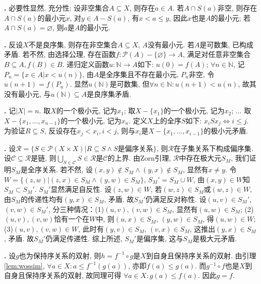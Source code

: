 \par \textbf{\thesolpar .} 必要性显然. 充分性: 设非空集合$A\subseteq X$, 则存在$a\in A$. 若$A\cap S(a)$非空, 则存在$A\cap S(a)$的最小元$x$, 对$y\in A-S(a)$, 有$x<a\le y$, 因此$x$也是$A$的最小元; 若$A\cap S(a)= \varnothing$, 则$a$是$A$的最小元. 

\par \textbf{\thesolpar .} 反设$X$不是良序集, 则存在非空集合$A\subseteq X$, $A$没有最小元. 若$A$是可数集, 已构成矛盾. 若不然, 由选择公理, 存在函数$f:\mathcal{P}(A)-\{\varnothing\}\to A$, 满足对任意非空集合$B\subseteq A, f(B)\in B$. 递归定义函数$u:\mathbb{N}\to A$如下: $u(0)=f(A)$; $\forall n\in \mathbb{N}$, 记$P_n=\{x\in A\vert x<u(n)\}$, 由$A$是全序集且不存在最小元, $P_n$非空, 令$u(n+1)=f(P_n)$. 显然$u(\mathbb{N})$是可数集, 但$\forall n\in \mathbb{N}: u(n+1)<u(n)$, 故其没有最小元, 与$u(\mathbb{N})\subseteq A$是良序集矛盾. 

\par \textbf{\thesolpar .} \cite{IC} 记$|X|=n$. 取$X$的一个极小元, 记为$x_1$; 取$X-\{x_1\}$的一个极小元, 记为$x_2$; ... 取$X-\{x_1,\dots,x_{n-1}\}$的一个极小元, 记为$x_n$. 定义$X$上的全序$S$如下: $x_i S  x_j \iff i\le j$. 为验证$R\subseteq S$, 反设存在$x_j<x_i, i<j$, 则与$x_i$是$X-\{x_1,\dots,x_{i-1}\}$的极小元矛盾. 

\par \textbf{\thesolpar .} 设$\mathcal{R}=\{S\in \mathcal{P}(X\times X)\vert R\subseteq S \land S\text{是偏序关系}\}$, 则$\mathcal{R}$在子集关系下构成偏序集. 设$\mathcal{C}\subseteq \mathcal{R}$是链, 则$\bigcup_{S\in \mathcal{C}}S\in \mathcal{R}$是$\mathcal{C}$的上界. 由Zorn引理, $\mathcal{R}$中存在极大元$S_M$, 我们证明$S_M$是全序关系. 若不然, 设$(x,y)\notin S_M \land (y,x)\notin S_M$, 显然有$x\neq y$. 令$W=\{(z,w)\vert (z,x)\in S_M \land (y,w)\in S_M\}$, $S_M'=S_M\cup W$, 由$(x,y)\in W$知$S_M\subset S_M'$. $S_M'$显然满足自反性. 设$(z,w)\in W$, 若$(w,z)\in S_M$或$(w,z)\in W$, 由$S_M$的传递性均有$(y,x)\in S_M$, 矛盾. 故$S_M'$仍满足反对称性. 设$(u,v)\in S_M'$, $(v,w)\in S_M'$, 分三种情况：(1)$(u,v),(v,w)\in S_M$, 显然有$(u,w)\in S_M$; (2)$(u,v),(v,w)$恰有一个在$W$中, 则$(u,x)\in S_M$, $(y,w)\in S_M$, 得$(u,w)\in W$; (3)$(u,v),(v,w)\in W$, 此时有$(y,v)\in S_M$, $(v,x)\in S_M$, 这推出$(y,x)\in S_M$, 矛盾. 故$S_M'$仍满足传递性. 综上所述, $S_M'$是偏序集, 这与$S_M$是极大元矛盾. 

\par \textbf{\thesolpar .} \cite{NST} 设$g$也为保持序关系的双射, 则$h=f^{-1}\circ g$是$X$到自身且保持序关系的双射. 由引理\ref{lem:wossim}, $\forall a\in X: a\le f^{-1}(g(a))$, 亦即$f(a)\le g(a)$. 而$g^{-1}\circ f$也是$X$到自身且保持序关系的双射, 故同理可得 $\forall a\in X: g(a)\le f(a)$. 因此$g=f$. 


